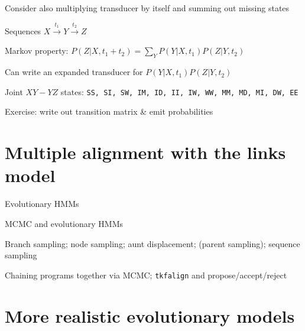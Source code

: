 \documentclass{beamer}
\begin{document}
\begin{frame}{}
Consider also multiplying transducer by itself and summing out missing states
  \itemb
  \item Sequences $X \stackrel{t_1}{\to} Y \stackrel{t_2}{\to} Z$
  \item Markov property: $P(Z|X,t_1+t_2) = \sum_Y P(Y|X,t_1) P(Z|Y,t_2)$
  \item Can write an expanded transducer for $P(Y|X,t_1) P(Z|Y,t_2)$
   \itemb
   \item Joint $XY-YZ$ states: {\tt SS, SI, SW, IM, ID, II, IW, WW, MM, MD, MI, DW, EE}
   \item Exercise: write out transition matrix \& emit probabilities
   \iteme
  \iteme
\end{frame}

\section{Multiple alignment with the links model}

\begin{frame}{}

\itemb
\item Evolutionary HMMs
\item MCMC and evolutionary HMMs
 \itemb
 \item Branch sampling; node sampling; aunt displacement; (parent sampling); sequence sampling
 \item Chaining programs together via MCMC; {\tt tkfalign} and propose/accept/reject
 \iteme
\iteme

\end{frame}

\section{More realistic evolutionary models}
\end{document}
